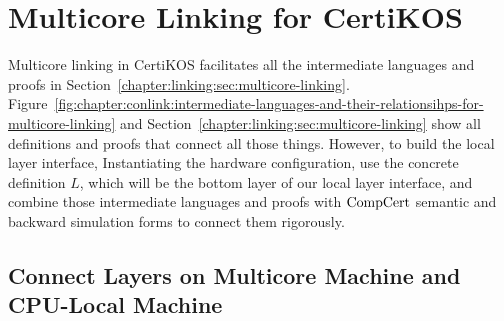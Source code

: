 \section{Multicore Linking for CertiKOS}
\label{chapter:certikos:sec:multicore-linking-for-certikos}

Multicore linking in CertiKOS facilitates all the intermediate languages
and proofs in Section~\ref{chapter:linking:sec:multicore-linking}.
Figure~\ref{fig:chapter:conlink:intermediate-languages-and-their-relationsihps-for-multicore-linking} and 
Section~\ref{chapter:linking:sec:multicore-linking} show all definitions and 
proofs that connect all those things. 
However, to build the local layer interface, 
Instantiating the hardware configuration, 
use the concrete definition $L$, which will be the 
bottom layer of our local layer interface, 
and combine those intermediate languages and proofs with $\mathrm{CompCert}$ semantic and backward simulation 
forms to connect them rigorously. 





\subsection{Connect Layers on Multicore Machine and CPU-Local Machine}
\label{chapter:certikos:subsec:connect-multicore}

